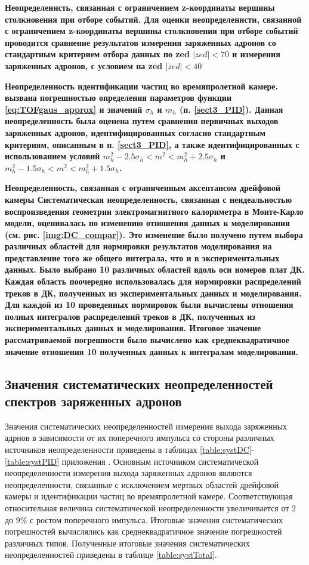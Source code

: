 \bfseries Неопределеннсть, связанная с ограничением z-координаты вершины столкновения при отборе событий. 
\mdseries
Для оценки неопределеннсти, связанной с ограничением z-координаты вершины столкновения при отборе событий проводится сравнение результатов измерения заряженных адронов со стандартным критерием отбора данных по zed $|zed|<70$ и измерения заряженных адронов, с условием на zed $|zed|<40$ 

\bfseries Неопределенность идентификации частиц во времяпролетной камере.
\mdseries
вызвана погрешностью определения параметров функции \ref{eq:TOFgaus_approx} и значений  $\sigma_h$ и $m_h$ (п. \ref{sect3_PID}). Данная неопределенность была оценена путем сравнения первичных выходов заряженных адронов, идентифицированных согласно стандартным критериям, описанным в п. \ref{sect3_PID}, а также идентифицированных с использованием условий $ m^2_h -2.5\sigma_h < m^2 < m^2_h +2.5\sigma_h $ и  $ m^2_h -1.5\sigma_h < m^2 < m^2_h +1.5\sigma_h $.

\bfseries Неопределенность, связанная с ограниченным аксептансом дрейфовой камеры
\mdseries
Систематическая неопределенность, связанная с неидеальностью воспроизведения геометрии электромагнитного калориметра в Монте-Карло модели, оценивалась по изменению отношения данных к моделирования (см.  рис. \ref{img:DC_compar}). Это изменение было получено путем выбора различных областей для нормировки результатов моделирования на представление того же общего интеграла, что и в экспериментальных данных. Было выбрано 10 различных областей вдоль оси номеров плат ДК. Каждая область поочередно использовалась для нормировки распределений треков в ДК, полученных из экспериментальных данных и моделирования. Для каждой из 10 проведенных нормировок были вычислены отношения полных интегралов распределений треков в ДК, полученных из экспериментальных данных и моделирования. Итоговое значение рассматриваемой погрешности было вычислено как среднеквадратичное значение отношения 10 полученных данных к интегралам моделирования. 

\subsection{Значения систематических неопределенностей спектров заряженных адронов} \label{sect3:SystValues}
Значения систематических неопределенностей измерения выхода заряженных адрнов в зависимости от их поперечного импульса со стороны различных источников неопределенности приведены в таблицах \ref{table:systDC}-\ref{table:systPID} приложения \label{AppendixA}. Основным источником систематической неопределенности измерения выхода заряженных адронов являются неопределенности, связанные с исключением мертвых областей дрейфовой камеры и идентификации частиц во времяпролетной камере. Соответствующая относительная величина систематической неопределенности увеличивается от 2 до 9\% с ростом поперечного импульса. 
Итоговые значения систематических погрешностей вычислялись как среднеквадратичное значение погрешностей различных типов. Полученные итоговые значения систематических неопределенностей приведены в таблице \ref{table:systTotal}.

